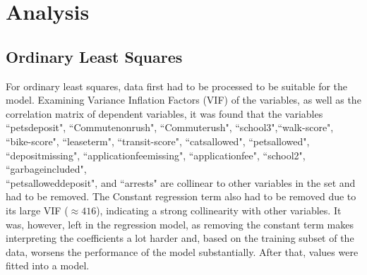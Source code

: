 \documentclass[12pt]{report}
\begin{document}
\section{Analysis}
\subsection{Ordinary Least Squares}
For ordinary least squares, data first had to be processed to be suitable for the model. Examining Variance Inflation Factors (VIF) of the variables, as well as the correlation matrix of dependent variables, it was found that the variables ``pets\textunderscore deposit", ``Commute\textunderscore nonrush", ``Commute\textunderscore rush", ``school3",``walk-score", ``bike-score", ``lease\textunderscore term", ``transit-score", ``cats\textunderscore allowed", ``pets\textunderscore allowed", ``deposit\textunderscore missing", ``application\textunderscore fee\textunderscore missing", ``application\textunderscore fee", ``school2", ``garbageincluded", \\ ``pets\textunderscore allowed\textunderscore deposit", and ``arrests" are collinear to other variables in the set and had to be removed. The Constant regression term also had to be removed due to its large VIF ($\approx416$), indicating a strong collinearity with other variables. It was, however, left in the regression model, as removing the constant term makes interpreting the coefficients a lot harder and, based on the training subset of the data, worsens the performance of the model substantially. After that, values were fitted into a model.
\end{document}
